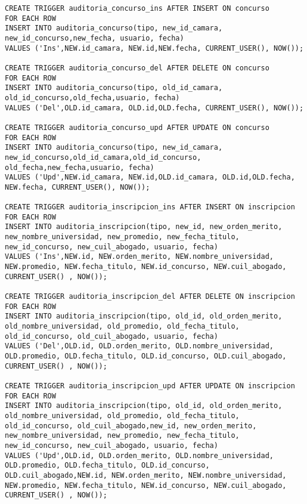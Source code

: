 \begin{verbatim}
CREATE TRIGGER auditoria_concurso_ins AFTER INSERT ON concurso
FOR EACH ROW
INSERT INTO auditoria_concurso(tipo, new_id_camara, new_id_concurso,new_fecha, usuario, fecha)
VALUES ('Ins',NEW.id_camara, NEW.id,NEW.fecha, CURRENT_USER(), NOW());

CREATE TRIGGER auditoria_concurso_del AFTER DELETE ON concurso
FOR EACH ROW
INSERT INTO auditoria_concurso(tipo, old_id_camara, old_id_concurso,old_fecha,usuario, fecha)
VALUES ('Del',OLD.id_camara, OLD.id,OLD.fecha, CURRENT_USER(), NOW());

CREATE TRIGGER auditoria_concurso_upd AFTER UPDATE ON concurso
FOR EACH ROW
INSERT INTO auditoria_concurso(tipo, new_id_camara, new_id_concurso,old_id_camara,old_id_concurso, old_fecha,new_fecha,usuario, fecha)
VALUES ('Upd',NEW.id_camara, NEW.id,OLD.id_camara, OLD.id,OLD.fecha, NEW.fecha, CURRENT_USER(), NOW());

CREATE TRIGGER auditoria_inscripcion_ins AFTER INSERT ON inscripcion
FOR EACH ROW
INSERT INTO auditoria_inscripcion(tipo, new_id, new_orden_merito, new_nombre_universidad, new_promedio, new_fecha_titulo, new_id_concurso, new_cuil_abogado, usuario, fecha)
VALUES ('Ins',NEW.id, NEW.orden_merito, NEW.nombre_universidad, NEW.promedio, NEW.fecha_titulo, NEW.id_concurso, NEW.cuil_abogado, CURRENT_USER() , NOW());

CREATE TRIGGER auditoria_inscripcion_del AFTER DELETE ON inscripcion
FOR EACH ROW
INSERT INTO auditoria_inscripcion(tipo, old_id, old_orden_merito, old_nombre_universidad, old_promedio, old_fecha_titulo, old_id_concurso, old_cuil_abogado, usuario, fecha)
VALUES ('Del',OLD.id, OLD.orden_merito, OLD.nombre_universidad, OLD.promedio, OLD.fecha_titulo, OLD.id_concurso, OLD.cuil_abogado, CURRENT_USER() , NOW());

CREATE TRIGGER auditoria_inscripcion_upd AFTER UPDATE ON inscripcion
FOR EACH ROW
INSERT INTO auditoria_inscripcion(tipo, old_id, old_orden_merito, old_nombre_universidad, old_promedio, old_fecha_titulo, old_id_concurso, old_cuil_abogado,new_id, new_orden_merito, new_nombre_universidad, new_promedio, new_fecha_titulo, new_id_concurso, new_cuil_abogado, usuario, fecha)
VALUES ('Upd',OLD.id, OLD.orden_merito, OLD.nombre_universidad, OLD.promedio, OLD.fecha_titulo, OLD.id_concurso, OLD.cuil_abogado,NEW.id, NEW.orden_merito, NEW.nombre_universidad, NEW.promedio, NEW.fecha_titulo, NEW.id_concurso, NEW.cuil_abogado, CURRENT_USER() , NOW());

\end{verbatim}

